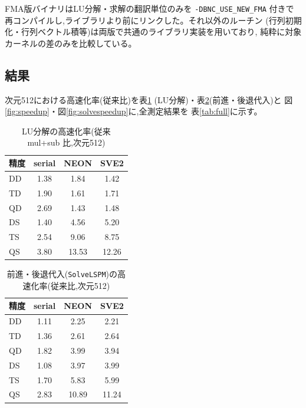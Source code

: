 \documentclass[a4j,dvipdfmx,11pt]{jsarticle}
\begin{document}
FMA版バイナリはLU分解・求解の翻訳単位のみを \texttt{-DBNC\_USE\_NEW\_FMA}
付きで再コンパイルし,ライブラリより前にリンクした。それ以外のルーチン
(行列初期化・行列ベクトル積等)は両版で共通のライブラリ実装を用いており,
純粋に対象カーネルの差のみを比較している。

\subsection{結果}

次元512における高速化率(従来比)を表\ref{tab:speedup}
(LU分解)・表\ref{tab:solvespeedup}(前進・後退代入)と
図\ref{fig:speedup}・図\ref{fig:solvespeedup}に,全測定結果を
表\ref{tab:full}に示す。

\begin{table}[htbp]
\centering
\caption{LU分解の高速化率(従来 mul+sub 比,次元512)}
\label{tab:speedup}
\begin{tabular}{lccc}
\toprule
精度 & serial & NEON & SVE2 \\
\midrule
DD & 1.38 & 1.84 & 1.42 \\
TD & 1.90 & 1.61 & 1.71 \\
QD & 2.69 & 1.43 & 1.48 \\
DS & 1.40 & 4.56 & 5.20 \\
TS & 2.54 & 9.06 & 8.75 \\
QS & 3.80 & 13.53 & 12.26 \\
\bottomrule
\end{tabular}
\end{table}

\begin{table}[htbp]
\centering
\caption{前進・後退代入(\texttt{SolveLSPM})の高速化率(従来比,次元512)}
\label{tab:solvespeedup}
\begin{tabular}{lccc}
\toprule
精度 & serial & NEON & SVE2 \\
\midrule
DD & 1.11 & 2.25 & 2.21 \\
TD & 1.36 & 2.61 & 2.64 \\
QD & 1.82 & 3.99 & 3.94 \\
DS & 1.08 & 3.97 & 3.99 \\
TS & 1.70 & 5.83 & 5.99 \\
QS & 2.83 & 10.89 & 11.24 \\
\bottomrule
\end{tabular}
\end{table}
\end{document}
